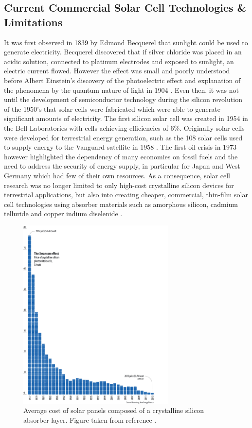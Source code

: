 \subsection{Current Commercial Solar Cell Technologies \& Limitations}\label{current_tech}
It was first observed in 1839 by Edmond Becquerel that sunlight could be used to generate electricity. Becquerel discovered that if  silver chloride was placed in an acidic solution, connected to platinum electrodes and exposed to sunlight, an electric current flowed. However the effect was small and poorly understood before Albert Einstein's discovery of the photoelectric effect and explanation of the phenomena by the quantum nature of light in 1904 \cite{PV_history1}. Even then, it was not until the development of semiconductor technology during the silicon revolution of the 1950's that solar cells were fabricated which were able to generate significant amounts of electricity. The first silicon solar cell was created in 1954 in the Bell Laboratories with cells achieving efficiencies of 6\%. 
Originally solar cells were developed for terrestrial energy generation, such as the 108 solar cells used to supply energy to the Vanguard satellite in 1958 \cite{PV_history1}. The first oil crisis in 1973 however highlighted the dependency of many economies on fossil fuels and the need to address the security of energy supply,  in particular for Japan and West Germany which had few of their own resources. As a consequence, solar cell research was no longer limited to only high-cost crystalline silicon devices for terrestrial applications, but also into creating cheaper, commercial, thin-film solar cell technologies using absorber materials such as amorphous silicon, cadmium telluride and copper indium diselenide  \cite{PV_history2}.

\begin{figure}[h!]
  \centering
    \includegraphics[width=0.7\textwidth]{figures/Si_cost.jpg}
    \caption{Average cost of solar panels composed of a crystalline silicon absorber layer. Figure taken from reference .}
  \label{Si_cost}
\end{figure}

